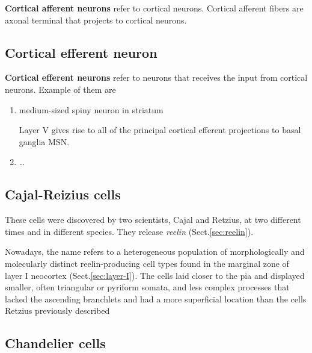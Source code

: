 {\bf Cortical afferent neurons} refer to cortical neurons.
Cortical afferent fibers are axonal terminal that projects to cortical neurons. 
%   

\subsection{Cortical efferent neuron}
\label{sec:cortical-efferent-neuron}

{\bf Cortical efferent neurons} refer to neurons that receives the input from
cortical neurons. Example of them are
\begin{enumerate}
  \item medium-sized spiny neuron in striatum

Layer V gives rise to all of the principal cortical efferent projections to
basal ganglia MSN.
  
  \item \ldots
\end{enumerate}



\subsection{Cajal-Reizius cells}
\label{sec:Cajal-Reizius-cell}

These cells were discovered by two scientists, Cajal and Retzius, at two
different times and in different species. 
They release {\it reelin} (Sect.\ref{sec:reelin}).

Nowadays, the name refers to a heterogeneous population of morphologically and
molecularly distinct reelin-producing cell types found in the marginal zone of
layer I neocortex (Sect.\ref{sec:layer-I}). The cells laid closer to the pia and
displayed smaller, often triangular or pyriform somata, and less complex
processes that lacked the ascending branchlets and had a more superficial
location than the cells Retzius previously described

\subsection{Chandelier cells}
\label{sec:chandelier-cells}

